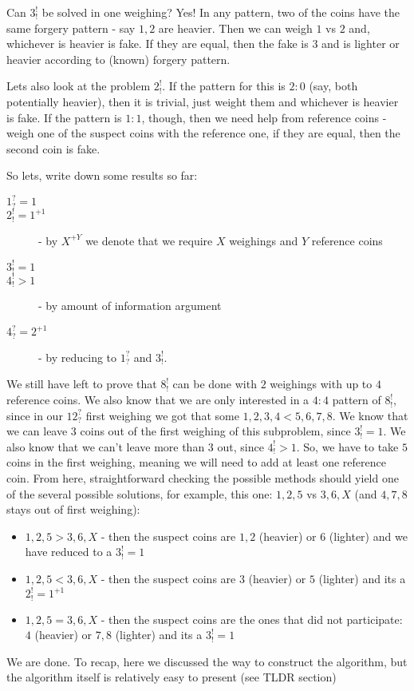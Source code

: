\begin{problem}
Can $3^!_!$ be solved in one weighing? Yes! In any pattern, two of the coins have the same forgery pattern - say $1,2$ are heavier. Then we can weigh $1$ vs $2$ and, whichever is heavier is fake. If they are equal, then the fake is $3$ and is lighter or heavier according to (known) forgery pattern.

Lets also look at the problem $2^!_!$. If the pattern for this is $2:0$ (say, both potentially heavier), then it is trivial, just weight them and whichever is heavier is fake. If the pattern is $1:1$, though, then we need help from reference coins - weigh one of the suspect coins with the reference one, if they are equal, then the second coin is fake. 

So lets, write down some results so far:
\begin{description}
\item[$1^?_?=1$]
\item[$2^!_!=1^{+1}$] - by $X^{+Y}$ we denote that we require $X$ weighings and $Y$ reference coins
\item[$3^!_!=1$]
\item[$4^!_!>1$] - by amount of information argument
\item[$4^?_?=2^{+1}$] - by reducing to $1^?_?$ and $3^!_!$. \end{description}

We still have left to prove that $8_!^!$ can be done with $2$ weighings with up to $4$ reference coins. We also know that we are only interested in a $4:4$ pattern of $8_!^!$, since in our $12^?_?$ first weighing we got that some $1,2,3,4<5,6,7,8$. We know that we can leave $3$ coins out of the first weighing of this subproblem, since $3^!_!=1$. We also know that we can't leave more than $3$ out, since $4^!_!>1$. So, we have to take $5$ coins in the first weighing, meaning we will need to add at least one reference coin. From here, straightforward checking the possible methods should yield one of the several possible solutions, for example, this one: $1,2,5$ vs $3,6,X$ (and $4,7,8$ stays out of first weighing):
\begin{itemize}
\item $1,2,5 > 3,6,X$ - then the suspect coins are $1,2$ (heavier) or $6$ (lighter) and we have reduced to a $3^!_!=1$
\item $1,2,5 < 3,6,X$ - then the suspect coins are $3$ (heavier) or $5$ (lighter) and its a $2^!_!=1^{+1}$
\item $1,2,5 = 3,6,X$ - then the suspect coins are the ones that did not participate: $4$ (heavier) or $7,8$ (lighter) and its a $3^!_!=1$
\end{itemize}

We are done. 
To recap, here we discussed the way to construct the algorithm, but the algorithm itself is relatively easy to present (see TLDR section)


\end{problem}
%


